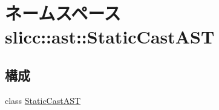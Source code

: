 \hypertarget{namespaceslicc_1_1ast_1_1StaticCastAST}{
\section{ネームスペース slicc::ast::StaticCastAST}
\label{namespaceslicc_1_1ast_1_1StaticCastAST}
}
\subsection*{構成}
\begin{DoxyCompactItemize}
\item 
class \hyperlink{classslicc_1_1ast_1_1StaticCastAST_1_1StaticCastAST}{StaticCastAST}
\end{DoxyCompactItemize}
